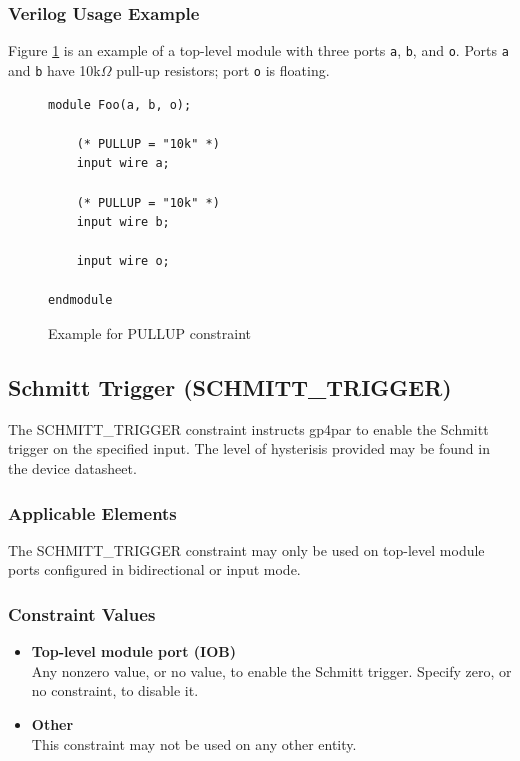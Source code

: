 \documentclass{article}
\begin{document}
\subsubsection{Verilog Usage Example}

Figure \ref{constraint-pullup} is an example of a top-level module with three ports \texttt{a}, \texttt{b}, and
\texttt{o}. Ports \texttt{a} and \texttt{b} have 10k$\Omega$ pull-up resistors; port \texttt{o} is floating.

\begin{figure}[h]
\begin{lstlisting}
module Foo(a, b, o);

	(* PULLUP = "10k" *)
	input wire a;

	(* PULLUP = "10k" *)
	input wire b;

	input wire o;
	
endmodule
\end{lstlisting}
\caption{Example for PULLUP constraint}
\label{constraint-pullup}
\end{figure}


\pagebreak
\subsection{Schmitt Trigger (SCHMITT\_TRIGGER)}

The SCHMITT\_TRIGGER constraint instructs gp4par to enable the Schmitt trigger on the specified input. The level 
of hysterisis provided may be found in the device datasheet.

\subsubsection{Applicable Elements}
The SCHMITT\_TRIGGER constraint may only be used on top-level module ports configured in bidirectional or input mode. 

\subsubsection{Constraint Values}
\begin{itemize}
\item {\bfseries Top-level module port (IOB)}\\
Any nonzero value, or no value, to enable the Schmitt trigger. Specify zero, or no constraint, to disable it.
\item {\bfseries Other} \\
This constraint may not be used on any other entity.
\end{itemize}
\end{document}
